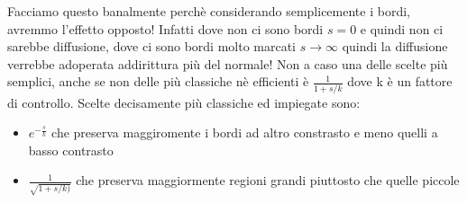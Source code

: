 Facciamo questo banalmente perchè considerando semplicemente i bordi, avremmo l'effetto opposto! Infatti dove non ci sono bordi $s=0$ e quindi non ci sarebbe diffusione, dove ci sono bordi molto marcati $s\to\infty$ quindi la diffusione verrebbe adoperata addirittura più del normale!
Non a caso una delle scelte più semplici, anche se non delle più classiche nè efficienti è $\frac{1}{1+s/k}$ dove k è un fattore di controllo.
Scelte decisamente più classiche ed impiegate sono:
\begin{itemize}
    \item $e^{-\frac{s}{k}}$ che preserva maggiromente i bordi ad altro constrasto e meno quelli a basso contrasto
    \item $\frac{1}{\sqrt{1+s/k)}}$ che preserva maggiormente regioni grandi piuttosto che quelle piccole
\end{itemize} 

\newpage
